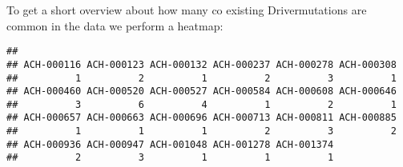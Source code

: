 \documentclass[]{article}
\newenvironment{Shaded}{\begin{snugshade}}{\end{snugshade}}
\newcommand{\CommentTok}[1]{\textcolor[rgb]{0.56,0.35,0.01}{\textit{#1}}}
\newcommand{\KeywordTok}[1]{\textcolor[rgb]{0.13,0.29,0.53}{\textbf{#1}}}
\newcommand{\NormalTok}[1]{#1}
\newcommand{\OperatorTok}[1]{\textcolor[rgb]{0.81,0.36,0.00}{\textbf{#1}}}
\newcommand{\StringTok}[1]{\textcolor[rgb]{0.31,0.60,0.02}{#1}}
\begin{document}
To get a short overview about how many co existing Drivermutations are
common in the data we perform a heatmap:

\begin{Shaded}
\end{Shaded}

\begin{verbatim}
## 
## ACH-000116 ACH-000123 ACH-000132 ACH-000237 ACH-000278 ACH-000308 
##          1          2          1          2          3          1 
## ACH-000460 ACH-000520 ACH-000527 ACH-000584 ACH-000608 ACH-000646 
##          3          6          4          1          2          1 
## ACH-000657 ACH-000663 ACH-000696 ACH-000713 ACH-000811 ACH-000885 
##          1          1          1          2          3          2 
## ACH-000936 ACH-000947 ACH-001048 ACH-001278 ACH-001374 
##          2          3          1          1          1
\end{verbatim}
\end{document}
